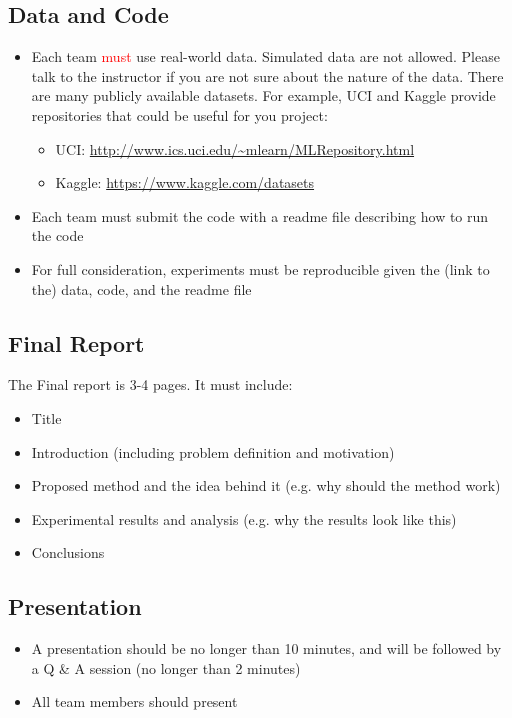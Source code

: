 \documentclass[pdftex,11pt]{artikel3}
\begin{document}
\subsection{Data and Code}
\begin{itemize}
\item Each team \textcolor{red}{must} use real-world data. Simulated data are not allowed. Please talk to the instructor if you are not sure about the nature of the data. There are many publicly available datasets. For example, UCI and Kaggle provide repositories that could be useful for you project:
	\begin{itemize}
	\item UCI: \url{http://www.ics.uci.edu/~mlearn/MLRepository.html}
	\item Kaggle: \url{https://www.kaggle.com/datasets}
	\end{itemize}
\item Each team must submit the code with a readme file describing how to run the code
\item For full consideration, experiments must be reproducible given the (link to the) data, code, and the readme file
\end{itemize}

\subsection{Final Report}
The Final report is 3-4 pages. It must include:
\begin{itemize}
\item Title
\item Introduction (including problem definition and motivation)
\item Proposed method and the idea behind it (e.g. why should the method work)
\item Experimental results and analysis (e.g. why the results look like this)
\item Conclusions
\end{itemize}

\subsection{Presentation}
\begin{itemize}
\item A presentation should be no longer than 10 minutes, and will be followed by a Q \& A session (no longer than 2 minutes)
\item All team members should present
\end{itemize}
\end{document}
